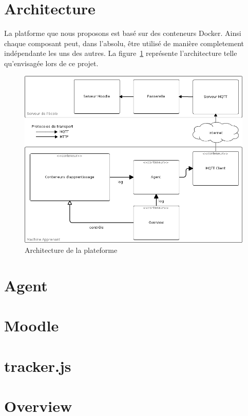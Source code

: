 \documentclass[a4paper,11pt]{report}
\begin{document}
\section{Architecture}

La platforme que nous proposons est basé sur des conteneurs Docker. Ainsi chaque composant peut, dans l'absolu, être utilisé de manière
completement indépendante les uns des autres. La figure~\ref{architecture} représente l'architecture telle qu'envisagée lors de ce projet.

\begin{figure}[h]
   \caption{\label{architecture} Architecture de la plateforme}
   \includegraphics[width=\textwidth, keepaspectratio=true]{architecture.png}
\end{figure}

\section{Agent}

\section{Moodle}

\section{tracker.js}

\section{Overview}
\end{document}
